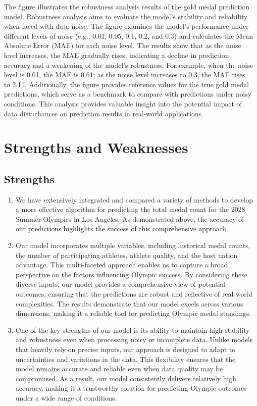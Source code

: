 \documentclass[12pt]{article}
\begin{document}
The figure illustrates the robustness analysis results of the gold medal prediction model. Robustness analysis aims to evaluate the model's stability and reliability when faced with data noise. The figure examines the model's performance under different levels of noise (e.g., 0.01, 0.05, 0.1, 0.2, and 0.3) and calculates the Mean Absolute Error (MAE) for each noise level. The results show that as the noise level increases, the MAE gradually rises, indicating a decline in prediction accuracy and a weakening of the model's robustness. For example, when the noise level is 0.01, the MAE is 0.61; as the noise level increases to 0.3, the MAE rises to 2.11. Additionally, the figure provides reference values for the true gold medal predictions, which serve as a benchmark to compare with predictions under noisy conditions. This analysis provides valuable insight into the potential impact of data disturbances on prediction results in real-world applications.



\section{Strengths and Weaknesses}
\subsection{Strengths}
\begin{enumerate}
    \item We have extensively integrated and compared a variety of methods to develop a more effective algorithm for predicting the total medal count for the 2028 Summer Olympics in Los Angeles. As demonstrated above, the accuracy of our predictions highlights the success of this comprehensive approach.
    \item Our model incorporates multiple variables, including historical medal counts, the number of participating athletes, athlete quality, and the host nation advantage. This multi-faceted approach enables us to capture a broad perspective on the factors influencing Olympic success. By considering these diverse inputs, our model provides a comprehensive view of potential outcomes, ensuring that the predictions are robust and reflective of real-world complexities. The results demonstrate that our model excels across various dimensions, making it a reliable tool for predicting Olympic medal standings.
    \item One of the key strengths of our model is its ability to maintain high stability and robustness even when processing noisy or incomplete data. Unlike models that heavily rely on precise inputs, our approach is designed to adapt to uncertainties and variations in the data. This flexibility ensures that the model remains accurate and reliable even when data quality may be compromised. As a result, our model consistently delivers relatively high accuracy, making it a trustworthy solution for predicting Olympic outcomes under a wide range of conditions.
\end{enumerate}
\end{document}
